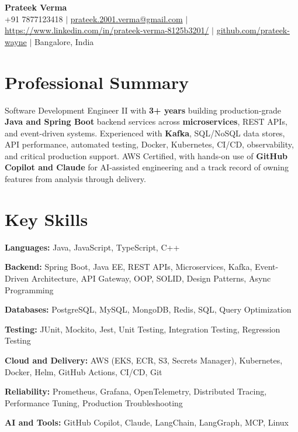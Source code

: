 \documentclass[letterpaper,10.5pt]{article}
\begin{document}
\begin{center}
  {\LARGE \textbf{Prateek Verma}} \\[2pt]
  +91 7877123418 \;$|$\;
  \href{mailto:prateek.2001.verma@gmail.com}{prateek.2001.verma@gmail.com} \;$|$\;
  \href{linkedin}{https://www.linkedin.com/in/prateek-verma-8125b3201/} \;$|$\;
  \href{https://github.com/Prateek-Wayne}{github.com/prateek-wayne} \;$|$\;
  Bangalore, India
\end{center}

\section{Professional Summary}
\small{
Software Development Engineer II with \textbf{3+ years} building production-grade \textbf{Java and Spring Boot} backend services across \textbf{microservices}, REST APIs, and event-driven systems. Experienced with \textbf{Kafka}, SQL/NoSQL data stores, API performance, automated testing, Docker, Kubernetes, CI/CD, observability, and critical production support. AWS Certified, with hands-on use of \textbf{GitHub Copilot and Claude} for AI-assisted engineering and a track record of owning features from analysis through delivery.
}

\section{Key Skills}
\begin{itemize}[leftmargin=0.15in, label={}, itemsep=-1pt]
  \small{
    \item \textbf{Languages:} Java, JavaScript, TypeScript, C++
    \item \textbf{Backend:} Spring Boot, Java EE, REST APIs, Microservices, Kafka, Event-Driven Architecture, API Gateway, OOP, SOLID, Design Patterns, Async Programming
    \item \textbf{Databases:} PostgreSQL, MySQL, MongoDB, Redis, SQL, Query Optimization
    \item \textbf{Testing:} JUnit, Mockito, Jest, Unit Testing, Integration Testing, Regression Testing
    \item \textbf{Cloud and Delivery:} AWS (EKS, ECR, S3, Secrets Manager), Kubernetes, Docker, Helm, GitHub Actions, CI/CD, Git
    \item \textbf{Reliability:} Prometheus, Grafana, OpenTelemetry, Distributed Tracing, Performance Tuning, Production Troubleshooting
    \item \textbf{AI and Tools:} GitHub Copilot, Claude, LangChain, LangGraph, MCP, Linux
  }
\end{itemize}
\end{document}

